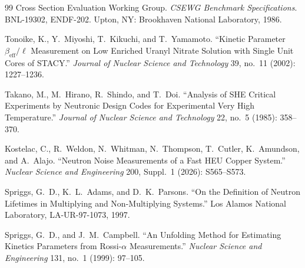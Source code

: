 \documentclass[12pt,preprint]{elsarticle}
\begin{document}
\begin{thebibliography}{99}
Cross Section Evaluation Working Group. \textit{CSEWG Benchmark Specifications}. BNL-19302, ENDF-202. Upton, NY: Brookhaven National Laboratory, 1986.

Tonoike, K., Y.\ Miyoshi, T.\ Kikuchi, and T.\ Yamamoto. ``Kinetic Parameter $\beta_{\mathrm{eff}}/\ell$ Measurement on Low Enriched Uranyl Nitrate Solution with Single Unit Cores of STACY.'' \textit{Journal of Nuclear Science and Technology} 39, no.\ 11 (2002): 1227--1236.

Takano, M., M.\ Hirano, R.\ Shindo, and T.\ Doi. ``Analysis of SHE Critical Experiments by Neutronic Design Codes for Experimental Very High Temperature.'' \textit{Journal of Nuclear Science and Technology} 22, no.\ 5 (1985): 358--370.

Kostelac, C., R.\ Weldon, N.\ Whitman, N.\ Thompson, T.\ Cutler, K.\ Amundson, and A.\ Alajo. ``Neutron Noise Measurements of a Fast HEU Copper System.'' \textit{Nuclear Science and Engineering} 200, Suppl.\ 1 (2026): S565--S573.

Spriggs, G.\ D., K.\ L.\ Adams, and D.\ K.\ Parsons. ``On the Definition of Neutron Lifetimes in Multiplying and Non-Multiplying Systems.'' Los Alamos National Laboratory, LA-UR-97-1073, 1997.

Spriggs, G.\ D., and J.\ M.\ Campbell. ``An Unfolding Method for Estimating Kinetics Parameters from Rossi-$\alpha$ Measurements.'' \textit{Nuclear Science and Engineering} 131, no.\ 1 (1999): 97--105.

\end{thebibliography}
\end{document}
